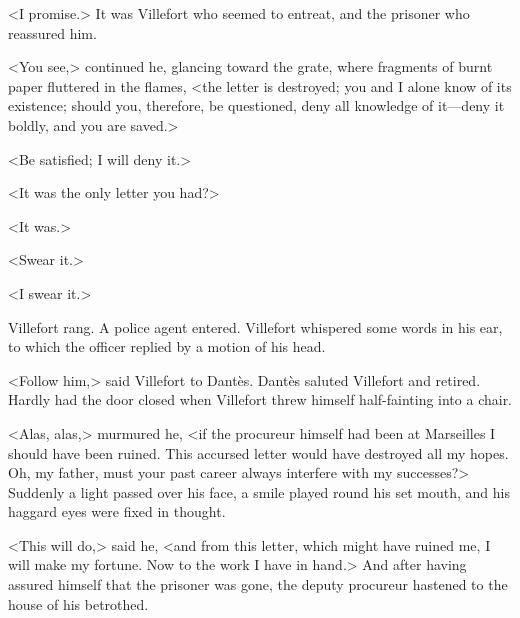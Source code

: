  <I promise.> It was Villefort who seemed to entreat, and the prisoner who reassured him. 

 <You see,> continued he, glancing toward the grate, where fragments of burnt paper fluttered in the flames, <the letter is destroyed; you and I alone know of its existence; should you, therefore, be questioned, deny all knowledge of it—deny it boldly, and you are saved.> 

 <Be satisfied; I will deny it.> 

 <It was the only letter you had?> 

 <It was.> 

 <Swear it.> 

 <I swear it.> 

 Villefort rang. A police agent entered. Villefort whispered some words in his ear, to which the officer replied by a motion of his head. 

 <Follow him,> said Villefort to Dantès. Dantès saluted Villefort and retired. Hardly had the door closed when Villefort threw himself half-fainting into a chair. 

 <Alas, alas,> murmured he, <if the procureur himself had been at Marseilles I should have been ruined. This accursed letter would have destroyed all my hopes. Oh, my father, must your past career always interfere with my successes?> Suddenly a light passed over his face, a smile played round his set mouth, and his haggard eyes were fixed in thought. 

 <This will do,> said he, <and from this letter, which might have ruined me, I will make my fortune. Now to the work I have in hand.> And after having assured himself that the prisoner was gone, the deputy procureur hastened to the house of his betrothed.